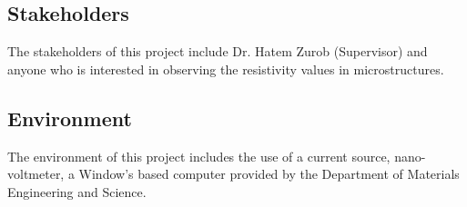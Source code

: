 \documentclass[12pt, titlepage]{article}
\begin{document}

\subsection{Stakeholders}
The stakeholders of this project include Dr. Hatem Zurob (Supervisor) and 
anyone who is interested in observing the resistivity values in microstructures.

\subsection{Environment}
The environment of this project includes the use of a current source, nano-voltmeter,
a Window's based computer provided by the Department of Materials Engineering and Science.

\newpage
\end{document}

